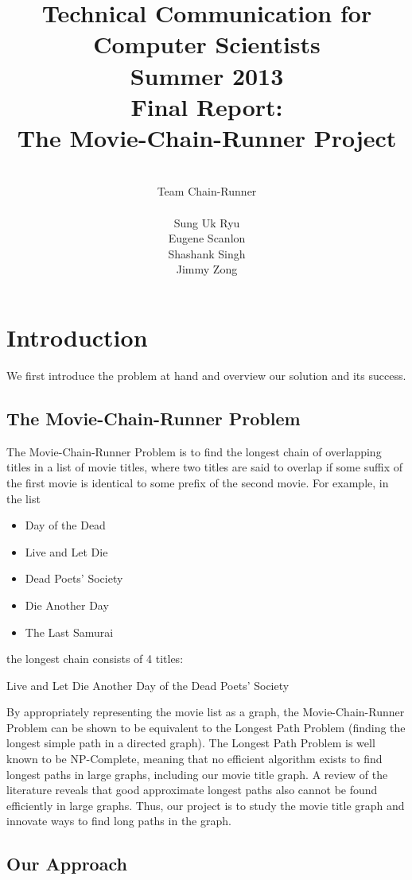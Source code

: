 \documentclass[11pt,english]{article}
\title{
{\normalsize \bf Technical Communication for Computer Scientists\\
Summer 2013}\\
\vspace{4cm}
{\bf Final Report:\\The Movie-Chain-Runner Project}}
\author{
\\Team Chain-Runner \\\\
Sung Uk Ryu\\
Eugene Scanlon\\
Shashank Singh\\
Jimmy Zong
}
\begin{document}


\tableofcontents

\newpage
{} %
\section{Introduction}
We first introduce the problem at hand and overview our solution and its
success.

\subsection{The Movie-Chain-Runner Problem}
The Movie-Chain-Runner Problem is to find the longest chain of overlapping
titles in a list of movie titles, where two titles are said to overlap if some
suffix of the first movie is identical to some prefix of the second movie. For
example, in the list
\begin{itemize}[noitemsep]
\item Day of the Dead
\item Live and Let Die
\item Dead Poets' Society
\item Die Another Day
\item The Last Samurai
\end{itemize}
the longest chain consists of 4 titles:

\begin{center}
Live and Let Die Another Day of the Dead Poets' Society
\end{center}
By appropriately representing the movie list as a graph, the Movie-Chain-Runner
Problem can be shown to be equivalent to the Longest Path Problem (finding the
longest simple path in a directed graph). The Longest Path Problem is well
known to be NP-Complete, meaning that no efficient algorithm exists to find
longest paths in large graphs, including our movie title graph. A review of the
literature reveals that good approximate longest paths also cannot be found
efficiently in large graphs. Thus, our project is to study the movie title
graph and innovate ways to find long paths in the graph.

\subsection{Our Approach}
\end{document}
